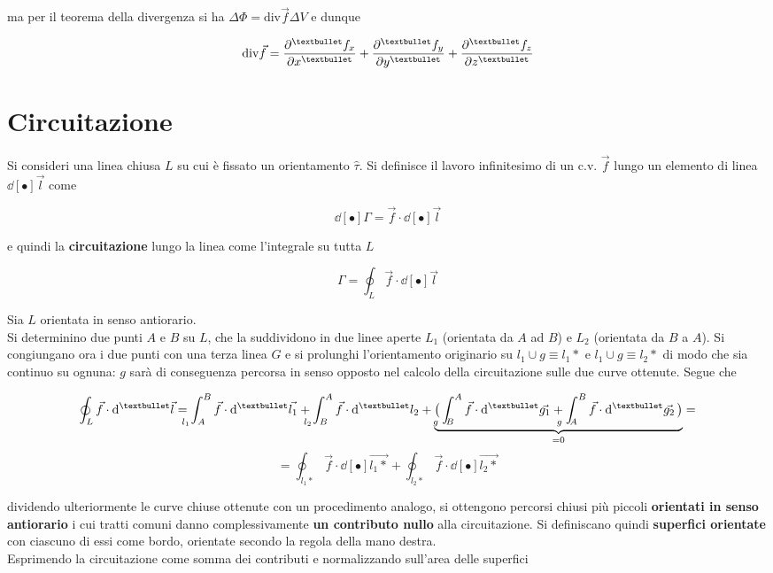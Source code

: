 ma per il teorema della divergenza si ha $\Delta \Phi = \mathrm{div} \vec{f} \Delta V$ e dunque

\[\mathrm{div} \vec{f} = \pdv[•]{f_x}{x} + \pdv[•]{f_y}{y} + \pdv[•]{f_z}{z}\]

\section{Circuitazione}

Si consideri una linea chiusa $L$ su cui è fissato un orientamento $\hat{\tau}$. Si definisce il lavoro infinitesimo di un c.v. $\vec{f}$ lungo un elemento di linea $\dd[•]{\vec{l}}$ come

\[\dd[•]{\Gamma} = \vec{f} \cdot \dd[•]{\vec{l}}\]

e quindi la \textbf{circuitazione} lungo la linea come l'integrale su tutta $L$

\[\Gamma = \oint_L \vec{f} \cdot \dd[•]{\vec{l}}\]

Sia $L$ orientata in senso antiorario. 
\\Si determinino due punti $A$ e $B$ su $L$, che la suddividono in due linee aperte $L_1$ (orientata da $A$ ad $B$) e $L_2$ (orientata da $B$ a $A$). Si congiungano ora i due punti con una terza linea $G$ e si prolunghi l'orientamento originario su $l_1 \cup g \equiv l_1*$ e $l_1 \cup g \equiv l_2*$ di modo che sia continuo su ognuna: $g$ sarà di conseguenza percorsa in senso opposto nel calcolo della circuitazione sulle due curve ottenute. Segue che

\[\oint_L \vec{f} \cdot \dd[•]{\vec{l}} = \int_{\hspace{-0.45cm} l_1 \hspace{0.22cm} A}^B \vec{f} \cdot \dd[•]{\vec{l_1}} + \int_{\hspace{-0.45cm} l_2 \hspace{0.22cm} B}^A \vec{f} \cdot \dd[•]{l_2} + \underbrace{\big(\int_{\hspace{-0.45cm} g \hspace{0.22cm} B}^A \vec{f} \cdot \dd[•]{\vec{g_1}} + \int_{\hspace{-0.45cm} g \hspace{0.22cm} A}^B \vec{f} \cdot \dd[•]{\vec{g_2}}\big)}_{= 0} = \]
\[= \oint_{l_1*} \vec{f} \cdot \dd[•]{\vec{l_1*}} + \oint_{l_2*} \vec{f} \cdot \dd[•]{\vec{l_2*}}\]

dividendo ulteriormente le curve chiuse ottenute con un procedimento analogo, si ottengono 
percorsi chiusi più piccoli \textbf{orientati in senso antiorario} i cui tratti comuni danno complessivamente \textbf{un contributo nullo} alla circuitazione. Si definiscano quindi \textbf{superfici orientate} con ciascuno di essi come bordo, orientate secondo la regola della mano destra.
\\Esprimendo la circuitazione come somma dei contributi e normalizzando sull'area delle superfici

